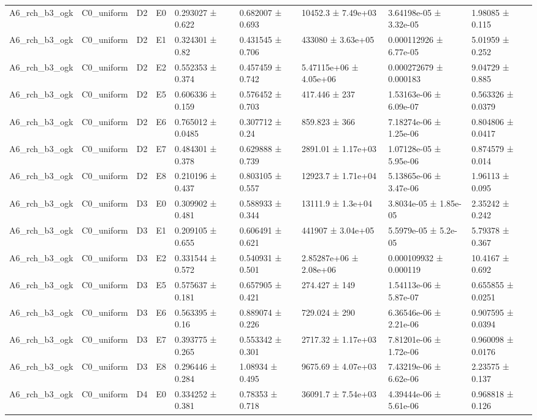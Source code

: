 \begin{table}
\begin{tabular}{lllllllll}
A6\_rch\_b3\_ogk & C0\_uniform & D2 & E0 & 0.293027 ± 0.622 & 0.682007 ± 0.693 & 10452.3 ± 7.49e+03 & 3.64198e-05 ± 3.32e-05 & 1.98085 ± 0.115 \\
A6\_rch\_b3\_ogk & C0\_uniform & D2 & E1 & 0.324301 ± 0.82 & 0.431545 ± 0.706 & 433080 ± 3.63e+05 & 0.000112926 ± 6.77e-05 & 5.01959 ± 0.252 \\
A6\_rch\_b3\_ogk & C0\_uniform & D2 & E2 & 0.552353 ± 0.374 & 0.457459 ± 0.742 & 5.47115e+06 ± 4.05e+06 & 0.000272679 ± 0.000183 & 9.04729 ± 0.885 \\
A6\_rch\_b3\_ogk & C0\_uniform & D2 & E5 & 0.606336 ± 0.159 & 0.576452 ± 0.703 & 417.446 ± 237 & 1.53163e-06 ± 6.09e-07 & 0.563326 ± 0.0379 \\
A6\_rch\_b3\_ogk & C0\_uniform & D2 & E6 & 0.765012 ± 0.0485 & 0.307712 ± 0.24 & 859.823 ± 366 & 7.18274e-06 ± 1.25e-06 & 0.804806 ± 0.0417 \\
A6\_rch\_b3\_ogk & C0\_uniform & D2 & E7 & 0.484301 ± 0.378 & 0.629888 ± 0.739 & 2891.01 ± 1.17e+03 & 1.07128e-05 ± 5.95e-06 & 0.874579 ± 0.014 \\
A6\_rch\_b3\_ogk & C0\_uniform & D2 & E8 & 0.210196 ± 0.437 & 0.803105 ± 0.557 & 12923.7 ± 1.71e+04 & 5.13865e-06 ± 3.47e-06 & 1.96113 ± 0.095 \\
A6\_rch\_b3\_ogk & C0\_uniform & D3 & E0 & 0.309902 ± 0.481 & 0.588933 ± 0.344 & 13111.9 ± 1.3e+04 & 3.8034e-05 ± 1.85e-05 & 2.35242 ± 0.242 \\
A6\_rch\_b3\_ogk & C0\_uniform & D3 & E1 & 0.209105 ± 0.655 & 0.606491 ± 0.621 & 441907 ± 3.04e+05 & 5.5979e-05 ± 5.2e-05 & 5.79378 ± 0.367 \\
A6\_rch\_b3\_ogk & C0\_uniform & D3 & E2 & 0.331544 ± 0.572 & 0.540931 ± 0.501 & 2.85287e+06 ± 2.08e+06 & 0.000109932 ± 0.000119 & 10.4167 ± 0.692 \\
A6\_rch\_b3\_ogk & C0\_uniform & D3 & E5 & 0.575637 ± 0.181 & 0.657905 ± 0.421 & 274.427 ± 149 & 1.54113e-06 ± 5.87e-07 & 0.655855 ± 0.0251 \\
A6\_rch\_b3\_ogk & C0\_uniform & D3 & E6 & 0.563395 ± 0.16 & 0.889074 ± 0.226 & 729.024 ± 290 & 6.36546e-06 ± 2.21e-06 & 0.907595 ± 0.0394 \\
A6\_rch\_b3\_ogk & C0\_uniform & D3 & E7 & 0.393775 ± 0.265 & 0.553342 ± 0.301 & 2717.32 ± 1.17e+03 & 7.81201e-06 ± 1.72e-06 & 0.960098 ± 0.0176 \\
A6\_rch\_b3\_ogk & C0\_uniform & D3 & E8 & 0.296446 ± 0.284 & 1.08934 ± 0.495 & 9675.69 ± 4.07e+03 & 7.43219e-06 ± 6.62e-06 & 2.23575 ± 0.137 \\
A6\_rch\_b3\_ogk & C0\_uniform & D4 & E0 & 0.334252 ± 0.381 & 0.78353 ± 0.718 & 36091.7 ± 7.54e+03 & 4.39444e-06 ± 5.61e-06 & 0.968818 ± 0.126 \\

\end{tabular}
\end{table}
